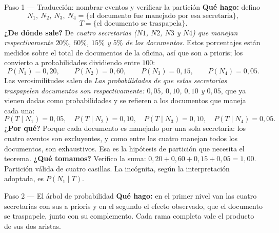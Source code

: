 \documentclass[11pt]{article}
\begin{document}
\begin{sol}

\begin{paso}{Paso 1 --- Traducción: nombrar eventos y verificar la partición}
\textbf{Qué hago:} defino
\[
N_1,\ N_2,\ N_3,\ N_4=\{\text{el documento fue manejado por esa secretaria}\},
\]
\[
T=\{\text{el documento se traspapela}\}.
\]
\textbf{¿De dónde sale?} De \emph{cuatro secretarias ($N1$, $N2$, $N3$ y $N4$) que manejan respectivamente $20\%$, $60\%$, $15\%$ y $5\%$ de los documentos}. Estos porcentajes están medidos sobre el total de documentos de la oficina, así que son a prioris; los convierto a probabilidades dividiendo entre $100$:
\[
P(N_1)=0,20,\qquad P(N_2)=0,60,\qquad P(N_3)=0,15,\qquad P(N_4)=0,05 .
\]
Las verosimilitudes salen de \emph{Las probabilidades de que estas secretarias traspapelen documentos son respectivamente: $0,05$, $0,10$, $0,10$ y $0,05$}, que ya vienen dadas como probabilidades y se refieren a los documentos que maneja cada una:
\[
P(T\mid N_1)=0,05,\quad P(T\mid N_2)=0,10,\quad P(T\mid N_3)=0,10,\quad P(T\mid N_4)=0,05 .
\]
\textbf{¿Por qué?} Porque cada documento es manejado por una sola secretaria: los cuatro eventos son excluyentes, y como entre las cuatro manejan todos los documentos, son exhaustivos. Esa es la hipótesis de partición que necesita el teorema.
\textbf{¿Qué tomamos?} Verifico la suma: $0,20+0,60+0,15+0,05=1,00$. Partición válida de cuatro casillas. La incógnita, según la interpretación adoptada, es $P(N_1\mid T)$.
\end{paso}

\begin{paso}{Paso 2 --- El árbol de probabilidad}
\textbf{Qué hago:} en el primer nivel van las cuatro secretarias con sus a prioris y en el segundo el efecto observado, que el documento se traspapele, junto con su complemento. Cada rama completa vale el producto de sus dos aristas.

\begin{center}
\shorthandoff{<>}
\end{center}
\end{paso}
\end{sol}
\end{document}

